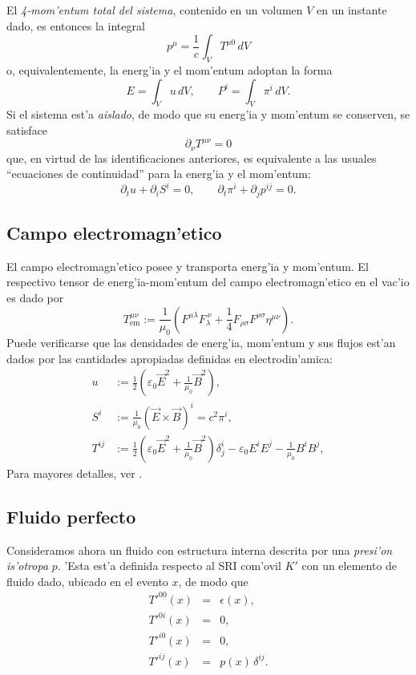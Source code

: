 El \textit{4-mom'entum total del sistema}, contenido en un volumen $V$ en un instante dado, es entonces la integral
\begin{equation}
p^\mu=\frac{1}{c}\int_V T^{\mu 0}\,dV \label{pmTmn}
\end{equation}
o, equivalentemente, la energ'ia y el mom'entum adoptan la forma
\begin{equation}
E=\int_V u\,dV, \qquad P^i=\int_V \pi^i\,dV.
\end{equation}
Si el sistema est'a \textit{aislado}, de modo que su energ'ia y mom'entum se conserven, se satisface 
\begin{equation}
 \partial_\nu T^{\mu \nu}=0
\end{equation}
que, en virtud de las identificaciones anteriores, es equivalente a las usuales ``ecuaciones de continuidad'' para la energ'ia y el mom'entum:
\begin{equation}
 \partial_tu+\partial_iS^i=0, \qquad \partial_t \pi^i+\partial_jp^{ij}=0.
\end{equation}


\subsection{Campo electromagn'etico}
El campo electromagn'etico posee y transporta energ'ia y mom'entum. El respectivo tensor de energ'ia-mom'entum del campo electromagn'etico en el vac'io es dado por
\begin{equation}
\boxed{T_\text{em}^{\mu\nu}:=\frac{1}{\mu_0}\left(  F^{\mu\lambda}F_\lambda^{\ \nu}+\frac{1}{4}F_{\rho\sigma}F^{\rho\sigma}\eta^{\mu\nu} \right).}  \label{temsimSI}
\end{equation}
Puede verificarse que las densidades de energ'ia, mom'entum y sus flujos est'an dados por las cantidades apropiadas definidas en electrodin'amica:
\begin{align}
u &:= \frac{1}{2}\left(\varepsilon_0\vec{E}^2+\frac{1}{\mu_0}\vec{B}^2\right),\label{uTheta}\\
S^i &:= \frac{1}{\mu_0}\left(\vec{E}\times\vec{B}\right)^i=c^2\pi^i, \label{STheta}\\
T^{ij} &:= \frac{1}{2}\left(\varepsilon_0\vec{E}^2+\frac{1}{\mu_0}\vec{B}^2\right)\delta_j^i-\varepsilon_0 E^i E^j -\frac{1}{\mu_0}B^i B^j , \label{TTheta}
\end{align}
Para mayores detalles, ver \cite{7}.


\subsection{Fluido perfecto}
Consideramos ahora un fluido con estructura interna descrita por una \textit{presi'on
is'otropa} $p$. 'Esta est'a definida respecto al SRI com'ovil $K'$ con un elemento de fluido dado, ubicado en el evento $x$, de modo que
\begin{eqnarray}
T'^{00}(x)&=&\epsilon(x) , \label{t00c}\\
T'^{0i}(x) &=&0, \label{t0ic}\\
T'^{i0}(x) &=&0, \label{ti0c}\\
T'^{ij}(x) &=&p(x)\,\delta^{ij} .\label{tijc}
\end{eqnarray}

